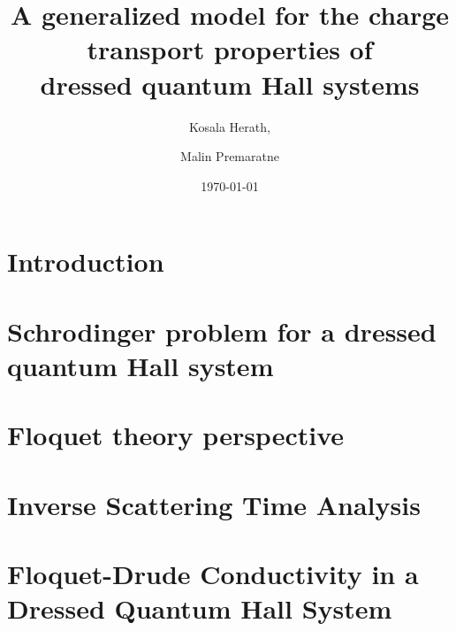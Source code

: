 \documentclass[
 reprint,
 amsmath,amssymb,
 aps,
 prb,
]{revtex4-2}
\begin{document}

\title{A generalized model for the charge transport properties of
\\dressed quantum Hall systems}

\author{Kosala Herath,}
\author{Malin Premaratne}

\date{\today}

\begin{abstract}

\end{abstract}

\maketitle

\section{\label{sec_introduction} Introduction}


\section{\label{sec_schrodinger_problem} Schrodinger problem for a dressed quantum Hall system}


\section{\label{sec_floquet_theory} Floquet theory perspective}


\section{\label{sec_inverse_scattering_time}  Inverse Scattering Time Analysis}


\section{\label{sec_floquet_drude_conductivity} Floquet-Drude Conductivity in a Dressed Quantum Hall System}

\end{document}
